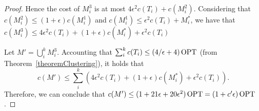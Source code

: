 \begin{proof}
    Hence the cost of \(M_i^3\) is at most \(4 \epsilon^2 c(T_i) + c(M_i^2)\). Considering that \(c(M_i^2) \leq (1 + \epsilon) c(M_i^1)\) and \(c(M_i^1) \leq \epsilon^2 c(T_i) + M^\ast_i\), we have that \(c(M_i^3) \leq 4 \epsilon^2 c(T_i) + (1 + \epsilon) c(M^\ast_i)  + \epsilon^2 c(T_i)\)

    Let \(M' = \bigcup_i^k M_i^3\). Accounting that \(\sum_i^k c(T_i) \leq (4/\epsilon + 4) \operatorname{\textrm{OPT}}\) (from Theorem~\ref{theoremClustering}), it holds that \[c(M') \leq \sum_i^k \left ( 4 \epsilon^2 c(T_i) + (1 + \epsilon) c(M^\ast_i)  + \epsilon^2 c(T_i) \right).\] 
    Therefore, we can conclude that  \(c(M') \leq (1 + 21 \epsilon + 20 \epsilon^2) \operatorname{\textrm{OPT}} = (1 + c'\epsilon) \operatorname{\textrm{OPT}}\).
\end{proof}
